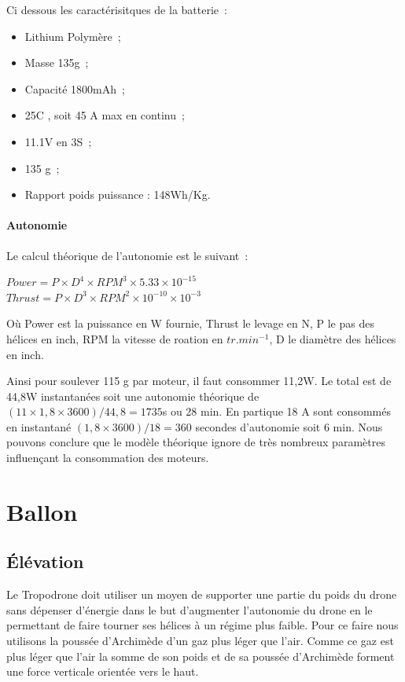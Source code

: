 \documentclass[a4paper,11pt]{article}
\begin{document}
Ci dessous les caractérisitques de la batterie~:
\begin{itemize}
		\item Lithium Polymère~;
		\item Masse 135g~;
		\item Capacité 1800mAh~;
		\item 25C , soit 45 A max en continu~;
		\item 11.1V en 3S~;
		\item 135 g~;
		\item Rapport poids puissance : 148Wh/Kg.
\end{itemize}


\paragraph{Autonomie}

Le calcul théorique de l'autonomie est le suivant~:

\begin{center}
 $Power = P \times D^4 \times RPM^3 \times 5.33 \times 10^{-15}$ \\
 $Thrust = P \times D^3 \times RPM^2 \times 10^{-10} \times 10^{-3}$
\end{center}

Où Power est la puissance en W fournie, Thrust le levage en N, P le pas des hélices en inch, RPM la vitesse de roation en $tr.min^{-1}$, D le diamètre des hélices en inch.

Ainsi pour soulever 115 g par moteur, il faut consommer 11,2W. Le total est de 44,8W instantanées soit une autonomie théorique de $(11 \times 1,8 \times 3600)/44,8 = 1735$s ou 28 min.
En partique 18 A sont consommés en instantané $(1,8 \times 3600)/18 = 360$ secondes d’autonomie soit 6 min. Nous pouvons conclure que le modèle théorique ignore de très nombreux paramètres influençant la consommation des moteurs.

\section{Ballon}

\subsection{Élévation}

Le Tropodrone doit utiliser un moyen de supporter une partie du poids du drone sans dépenser d'énergie dans le but d'augmenter l'autonomie du drone en le permettant de faire tourner ses hélices à un régime plus faible. Pour ce faire nous utilisons la poussée d'Archimède d'un gaz plus léger que l'air. Comme ce gaz est plus léger que l'air la somme de son poids et de sa poussée d'Archimède forment une force verticale orientée vers le haut.
\end{document}
